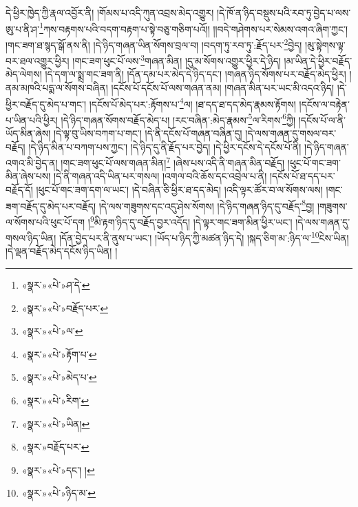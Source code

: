 དེ་ཕྱིར་ཁྱེད་ཀྱི་རྣལ་འབྱོར་ནི། །གོམས་པ་འདི་ཀུན་འབྲས་མེད་འགྱུར། །དེ་ཁོ་ན་ཉིད་བསྡུས་པའི་རབ་ཏུ་བྱེད་པ་ལས་ཨུ་པ་ནི་ཤ་\footnote{«སྣར་»«པེ་»ཤ་དེ་}ཀས་བརྟགས་པའི་བདག་བརྟག་པ་སྟེ་བཅུ་གཅིག་པའོ།། །།བདེ་གཤེགས་པར་སེམས་འགའ་ཞིག་ཀྱང་། །གང་ཟག་ཐ་སྙད་སྒོ་ནས་ནི། །དེ་ཉིད་གཞན་ཡིན་སོགས་བྲལ་བ། །བདག་ཏུ་རབ་ཏུ་:རྗོད་པར་\footnote{«སྣར་»«པེ་»བརྗོད་པར་}བྱེད། །མུ་སྟེགས་ལྟ་བར་ཐལ་འགྱུར་ཕྱིར། །གང་ཟག་ཕུང་པོ་ལས་\footnote{«སྣར་»«པེ་»ལ་}གཞན་མིན། །དུ་མ་སོགས་འགྱུར་ཕྱིར་དེ་ཉིད། །མ་ཡིན་དེ་ཕྱིར་བརྗོད་མེད་ལེགས། །དེ་དག་ལ་སྨྲ་གང་ཟག་ནི། །དོན་དམ་པར་མེད་དེ་ཉིད་དང་། །གཞན་ཉིད་སོགས་པར་བརྗོད་མེད་ཕྱིར། །ནམ་མཁའི་པདྨ་ལ་སོགས་བཞིན། །དངོས་པོ་དངོས་པོ་ལས་གཞན་ནམ། །གཞན་མིན་པར་ཡང་མི་འདའ་ཉིད། །དེ་ཕྱིར་བརྗོད་དུ་མེད་པ་གང་། །དངོས་པོ་མེད་པར་:རྟོགས་པ་\footnote{«སྣར་»«པེ་»རྟོག་པ་}ལ། །ཐ་དད་ཐ་དད་མེད་རྣམས་རྟོགས། །དངོས་ལ་བརྟེན་པ་ཡིན་པའི་ཕྱིར། །དེ་ཉིད་གཞན་སོགས་བརྗོད་མེད་པ། །རང་བཞིན་:མེད་རྣམས་\footnote{«སྣར་»«པེ་»མེད་པ་}ལ་རིགས་\footnote{«སྣར་»«པེ་»རིག་}ཀྱི། །དངོས་པོ་ལ་ནི་ཡོད་མིན་ཞེས། །དེ་ལྟ་བུ་ཡིས་བཀག་པ་གང་། །དེ་ནི་དངོས་པོ་གཞན་བཞིན་དུ། །དེ་ལས་གཞན་དུ་གསལ་བར་བརྗོད། །དེ་ཉིད་མིན་པ་བཀག་པས་ཀྱང་། །དེ་ཉིད་དུ་ནི་རྗོད་པར་བྱེད། །དེ་ཕྱིར་དངོས་དེ་དངོས་པོ་ནི། །དེ་ཉིད་གཞན་འགའ་མི་བྱེད་ན། །གང་ཟག་ཕུང་པོ་ལས་གཞན་མིན།\footnote{«སྣར་»«པེ་»ཡིན།} །ཞེས་པས་འདི་ནི་གཞན་མིན་བརྗོད། །ཕུང་པོ་གང་ཟག་མིན་ཞེས་པས། །དེ་ནི་གཞན་འདི་ཡིན་པར་གསལ། །འགལ་བའི་ཆོས་དང་འབྲེལ་པ་ནི། །དངོས་པོ་ཐ་དད་པར་བརྗོད་དོ། །ཕུང་པོ་གང་ཟག་དག་ལ་ཡང་། །དེ་བཞིན་ཅི་ཕྱིར་ཐ་དད་མེད། །འདི་ལྟར་ཚོར་བ་ལ་སོགས་ལས། །གང་ཟག་བརྗོད་དུ་མེད་པར་བརྗོད། །དེ་ལས་གཟུགས་དང་འདུ་ཤེས་སོགས། །དེ་ཉིད་གཞན་ཉིད་དུ་བརྗོད་\footnote{«སྣར་»བརྗོད་པར་}བྱ། །གཟུགས་ལ་སོགས་པའི་ཕུང་པོ་དག །\footnote{«སྣར་»«པེ་»དང་། །}མི་རྟག་ཉིད་དུ་བརྗོད་བྱར་འདོད། །དེ་ལྟར་གང་ཟག་མིན་ཕྱིར་ཡང་། །དེ་ལས་གཞན་དུ་གསལ་ཉིད་ཡིན། །དོན་བྱེད་པར་ནི་ནུས་པ་ཡང་། །ཡོད་པ་ཉིད་ཀྱི་མཚན་ཉིད་དེ། །སྐད་ཅིག་མ་:ཉིད་ལ་\footnote{«སྣར་»«པེ་»ཉིད་མ་}ངེས་ཡིན། །དེ་ལྡན་བརྗོད་མེད་དངོས་ཉིད་ཡིན། །
